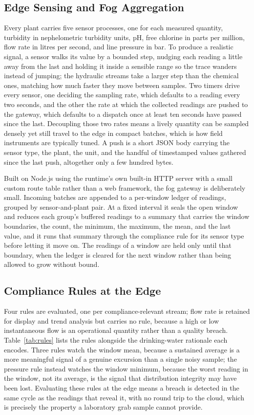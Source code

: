 \documentclass[conference]{IEEEtran}
\begin{document}
\subsection{Edge Sensing and Fog Aggregation}

Every plant carries five sensor processes, one for each measured quantity, turbidity in nephelometric turbidity units, pH, free chlorine in parts per million, flow rate in litres per second, and line pressure in bar. To produce a realistic signal, a sensor walks its value by a bounded step, nudging each reading a little away from the last and holding it inside a sensible range so the trace wanders instead of jumping; the hydraulic streams take a larger step than the chemical ones, matching how much faster they move between samples. Two timers drive every sensor, one deciding the sampling rate, which defaults to a reading every two seconds, and the other the rate at which the collected readings are pushed to the gateway, which defaults to a dispatch once at least ten seconds have passed since the last. Decoupling those two rates means a lively quantity can be sampled densely yet still travel to the edge in compact batches, which is how field instruments are typically tuned. A push is a short JSON body carrying the sensor type, the plant, the unit, and the handful of timestamped values gathered since the last push, altogether only a few hundred bytes.

Built on Node.js using the runtime's own built-in HTTP server with a small custom route table rather than a web framework, the fog gateway is deliberately small. Incoming batches are appended to a per-window ledger of readings, grouped by sensor-and-plant pair. At a fixed interval it seals the open window and reduces each group's buffered readings to a summary that carries the window boundaries, the count, the minimum, the maximum, the mean, and the last value, and it runs that summary through the compliance rule for its sensor type before letting it move on. The readings of a window are held only until that boundary, when the ledger is cleared for the next window rather than being allowed to grow without bound.

\subsection{Compliance Rules at the Edge}

Four rules are evaluated, one per compliance-relevant stream; flow rate is retained for display and trend analysis but carries no rule, because a high or low instantaneous flow is an operational quantity rather than a quality breach. Table~\ref{tab:rules} lists the rules alongside the drinking-water rationale each encodes. Three rules watch the window mean, because a sustained average is a more meaningful signal of a genuine excursion than a single noisy sample; the pressure rule instead watches the window minimum, because the worst reading in the window, not its average, is the signal that distribution integrity may have been lost. Evaluating these rules at the edge means a breach is detected in the same cycle as the readings that reveal it, with no round trip to the cloud, which is precisely the property a laboratory grab sample cannot provide.
\end{document}
